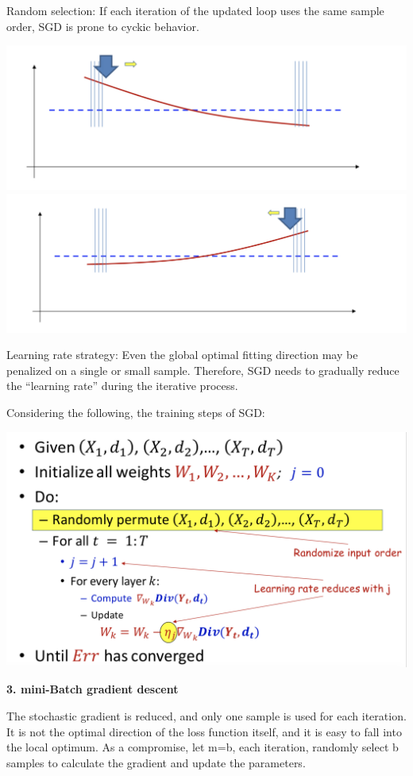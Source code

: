 \documentclass{article}
\begin{document}
	Random selection: If each iteration of the updated loop uses the same sample order, SGD is prone to cyckic behavior.
	
	\includegraphics[scale=0.2]{87.png}
	\includegraphics[scale=0.2]{88.png}
	
	Learning rate strategy: Even the global optimal fitting direction may be penalized on a single or small sample. Therefore, SGD needs to gradually reduce the “learning rate” during the iterative process.
	
	Considering the following, the training steps of SGD:
	
	\includegraphics[scale=0.2]{89.png}
	
	\textbf{3. mini-Batch gradient descent}
	
	The stochastic gradient is reduced, and only one sample is used for each iteration. It is not the optimal direction of the loss function itself, and it is easy to fall into the local optimum. As a compromise, let m=b, each iteration, randomly select b samples to calculate the gradient and update the parameters.
	
\end{document}
